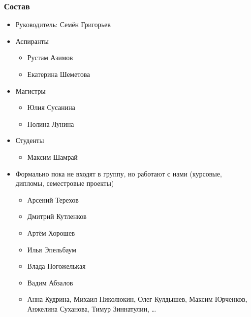 \documentclass[xcolor=table]{beamer}
\begin{document}
\begin{frame}[fragile]
  \transwipe[direction=90]
  \frametitle{Состав}
\begin{itemize}
      \item Руководитель: Семён Григорьев
      \item Аспиранты
      \begin{itemize}
        \item Рустам Азимов
        \item Екатерина Шеметова
      \end{itemize}
      \item Магистры
      \begin{itemize}
        \item Юлия Сусанина
        \item Полина Лунина
      \end{itemize}
      \item Студенты
      \begin{itemize}
        \item Максим Шамрай
      \end{itemize}
      \item Формально пока не входят в группу, но работают с нами (курсовые, дипломы, семестровые проекты)
      \begin{itemize}
        \item Арсений Терехов
        \item Дмитрий Кутленков
        \item Артём Хорошев
        \item Илья Эпельбаум
        \item Влада Погожелькая
        \item Вадим Абзалов
        \item Анна Кудрина, Михаил Николюкин, Олег Кулдышев, Максим Юрченков, Анжелина Суханова, Тимур Зиннатулин, \dots
      \end{itemize}

\end{itemize}

\end{frame}
\end{document}
